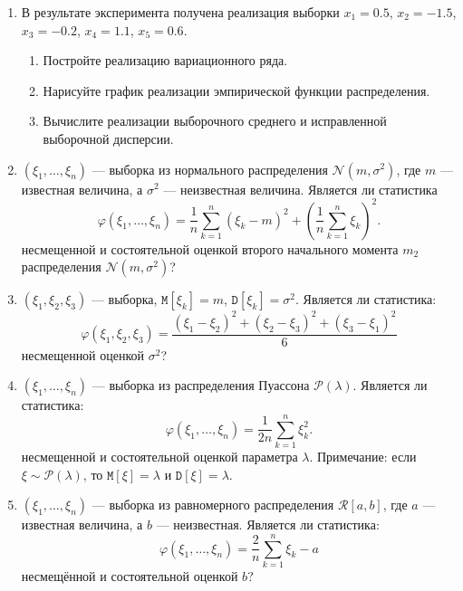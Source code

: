 \documentclass[a4paper,12pt]{article}
\newcommand{\expectation}[1]{\mathtt{M} \left[ #1 \right]}
\newcommand{\variance}[1]{\mathtt{D} \left[ #1 \right]}
\begin{document}
\begin{enumerate}
      \item В результате эксперимента получена реализация выборки $x_1 = 0.5$, $x_2 = -1.5$, $x_3 = -0.2$, $x_4 = 1.1$, $x_5 = 0.6$.
            \begin{enumerate}
                  \item Постройте реализацию вариационного ряда.
                  \item Нарисуйте график реализации эмпирической функции распределения.
                  \item Вычислите реализации выборочного среднего и исправленной выборочной дисперсии.
            \end{enumerate}

      \item $\left( \xi_1, \dots, \xi_n \right)$ --- выборка из нормального распределения $\mathcal{N}\left(m, \sigma^2 \right)$, где $m$ --- известная
            величина, а $\sigma^2$ --- неизвестная величина. Является ли статистика
            \[
                  \varphi(\xi_1, \dots, \xi_n) = \frac{1}{n} \sum_{k=1}^n \left( \xi_k - m \right)^2 + \left( \frac{1}{n} \sum_{k=1}^n \xi_k \right)^2.
            \]
            несмещенной и состоятельной оценкой второго начального момента $m_2$ распределения $\mathcal{N}\left(m, \sigma^2 \right)$?

      \item $\left( \xi_1, \xi_2, \xi_3 \right)$ --- выборка, $\expectation{\xi_k} = m$, $\variance{\xi_k} = \sigma^2$. Является ли статистика:
            \[
                  \varphi(\xi_1, \xi_2, \xi_3) = \frac{\left( \xi_1 - \xi_2 \right)^2 + \left( \xi_2 - \xi_3 \right)^2 + \left( \xi_3 - \xi_1 \right)^2}{6}
            \]
            несмещенной оценкой $\sigma^2$?

      \item $\left( \xi_1, \dots, \xi_n \right)$ --- выборка из распределения Пуассона $\mathcal{P}(\lambda)$. Является ли статистика:
            \[
                  \varphi(\xi_1, \dots, \xi_n) = \frac{1}{2 n} \sum_{k=1}^n \xi_k^2.
            \]
            несмещенной и состоятельной оценкой параметра $\lambda$. Примечание: если $\xi \sim \mathcal{P}(\lambda)$, то $\expectation{\xi} = \lambda$
            и $\variance{\xi} = \lambda$.

      \item $\left( \xi_1, \dots, \xi_n \right)$ --- выборка из равномерного распределения $\mathcal{R}\left[a, b \right]$, где $a$ --- известная величина,
            а $b$ --- неизвестная. Является ли статистика:
            \[
                  \varphi \left(\xi_1, \dots, \xi_n \right) = \frac{2}{n} \sum_{k=1}^n \xi_k - a
            \]
            несмещённой и состоятельной оценкой $b$?
\end{enumerate}
\end{document}
